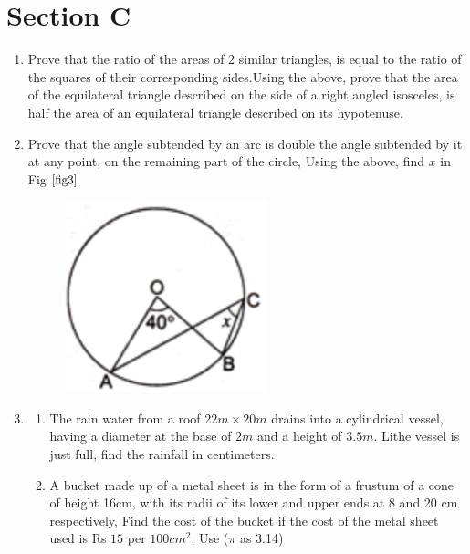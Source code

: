 \documentclass[journal,12pt,twocolumn]{IEEEtran}
\renewcommand\thesection{\arabic{section}}
\begin{document}
\section{Section C}
\renewcommand{\theequation}{\theenumi}
\begin{enumerate}[label=\thesection.\arabic*.,ref=\thesection.\theenumi]
\item Prove that the ratio of the areas of 2 similar triangles, is equal to the ratio
of the squares of their corresponding sides.Using the above, prove that the area of the
equilateral triangle described on the side of a right angled isosceles, is half the area
of an equilateral triangle described on its hypotenuse.\\
\item Prove that the angle subtended by an arc is double the angle subtended by it at any 
point, on the remaining part of the circle, Using the above, find $x$ in Fig $\ref{fig3}$
\begin{figure}[h!]
    \centering
    \includegraphics[width=0.5\columnwidth,center]{fig 1.3.png}
	\caption{}
	\label{fig3}
 \end{figure}
\item \begin{enumerate}
\item The rain water from a roof $22m \times 20m$ drains into a cylindrical vessel, having a diameter at the base of $2m$ and a height of $3.5m$. Lithe vessel is just full, find the rainfall in centimeters.\\
\item A bucket made up of a metal sheet is in the form of a frustum of a cone of height 16cm, with its radii of its lower and upper ends at 8 and 20 cm respectively, Find the cost of the bucket if the cost of the metal sheet used is Rs $15$ per $100 cm^2$. Use ($\pi$ as 3.14)\\
\end{enumerate}

\end{enumerate}
\end{document}

